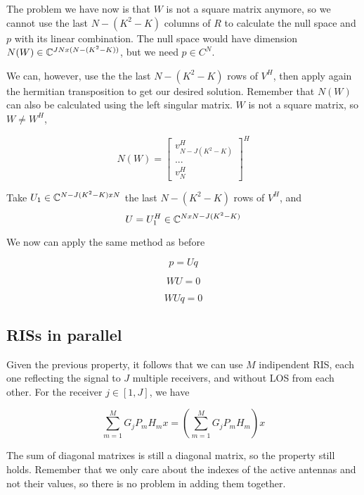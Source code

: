 The problem we have now is that $W$ is not a square matrix anymore, so we cannot use the last $N - (K^2 - K)$ columns of $R$ to calculate the null space and $p$ with its linear combination. The null space would have dimension $N(W) \in \mathbb{C}^{JN x (N - (K^2 - K))}$, but we need $p \in C^N$.

We can, however, use the the last $N - (K^2 - K)$ rows of $V^H$, then apply again the hermitian transposition to get our desired solution. Remember that $N(W)$ can also be calculated using the left singular matrix. $W$ is not a square matrix, so $W \ne W^H$,

\begin{equation}
  N(W) = \begin{bmatrix} v^H_{N - J(K^2 - K)} \\ ... \\ v^H_N \end{bmatrix} ^ H
\end{equation}

Take $U_1 \in \mathbb{C} ^ {N - J(K^2 - K) x N}$ the last $N - (K^2 - K)$ rows of $V^H$, and
\begin{equation}
  U = U_1^H \in \mathbb{C} ^ {N x N - J(K^2 - K)}
\end{equation}

We now can apply the same method as before

\begin{equation}p = Uq\end{equation}

\begin{equation}WU = 0\end{equation}

\begin{equation}WUq = 0\end{equation}

\subsection{RISs in parallel}

Given the previous property, it follows that we can use $M$ indipendent RIS, each one reflecting the signal to $J$ multiple receivers, and without LOS from each other. For the receiver $j \in [1, J]$, we have

\begin{equation}
  \sum_{m=1}^M G_j P_m H_m x = (\sum_{m=1}^M G_j P_m H_m) x
\end{equation}

The sum of diagonal matrixes is still a diagonal matrix, so the property still holds. Remember that we only care about the indexes of the active antennas and not their values, so there is no problem in adding them together.

